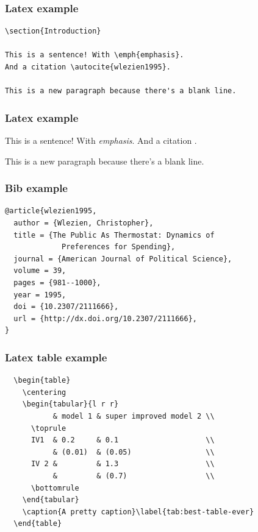 \documentclass[bigger, aspectratio=169]{beamer}
\begin{document}
\begin{frame}[fragile]
  \frametitle{Latex example}
\begin{verbatim}
\section{Introduction}

This is a sentence! With \emph{emphasis}. 
And a citation \autocite{wlezien1995}. 

This is a new paragraph because there's a blank line. 
\end{verbatim}
\end{frame}

\begin{frame}
  \frametitle{Latex example}
  This is a sentence! With \emph{emphasis}. 
  And a citation \autocite{wlezien1995}. 

  This is a new paragraph because there's a blank line. 
\end{frame}

\begin{frame}[fragile]
  \frametitle{Bib example}
\begin{verbatim}
@article{wlezien1995,
  author = {Wlezien, Christopher},
  title = {The Public As Thermostat: Dynamics of 
             Preferences for Spending},
  journal = {American Journal of Political Science},
  volume = 39,
  pages = {981--1000},
  year = 1995,
  doi = {10.2307/2111666},
  url = {http://dx.doi.org/10.2307/2111666},
}
\end{verbatim}
\end{frame}

\begin{frame}[fragile]
  \frametitle{Latex table example}
  \vspace{-0.19in}
\begin{verbatim}
  \begin{table}
    \centering
    \begin{tabular}{l r r}
           & model 1 & super improved model 2 \\
      \toprule
      IV1  & 0.2     & 0.1                    \\
           & (0.01)  & (0.05)                 \\
      IV 2 &         & 1.3                    \\
           &         & (0.7)                  \\
      \bottomrule
    \end{tabular}
    \caption{A pretty caption}\label{tab:best-table-ever}
  \end{table}
\end{verbatim}
\end{frame}
\end{document}

